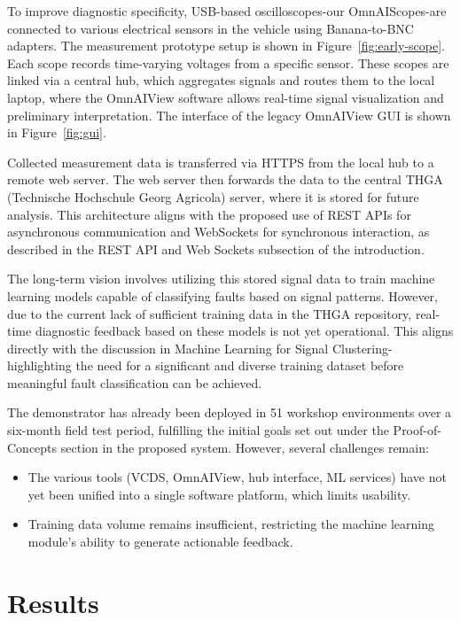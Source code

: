 To improve diagnostic specificity, USB-based oscilloscopes-our OmnAIScopes-are connected to various electrical sensors in the vehicle using Banana-to-BNC adapters. 
The measurement prototype setup is shown in Figure~\ref{fig:early-scope}.
Each scope records time-varying voltages from a specific sensor. 
These scopes are linked via a central hub, which aggregates signals and routes them to the local laptop, where the OmnAIView software allows real-time signal visualization and preliminary interpretation.
The interface of the legacy OmnAIView GUI is shown in Figure~\ref{fig:gui}.

Collected measurement data is transferred via HTTPS from the local hub to a remote web server. 
The web server then forwards the data to the central THGA (Technische Hochschule Georg Agricola) server, where it is stored for future analysis. 
This architecture aligns with the proposed use of REST APIs for asynchronous communication and WebSockets for synchronous interaction, as described in the REST API and Web Sockets subsection of the introduction.

The long-term vision involves utilizing this stored signal data to train machine learning models capable of classifying faults based on signal patterns. 
However, due to the current lack of sufficient training data in the THGA repository, real-time diagnostic feedback based on these models is not yet operational. 
This aligns directly with the discussion in Machine Learning for Signal Clustering-highlighting the need for a significant and diverse training dataset before meaningful fault classification can be achieved.

The demonstrator has already been deployed in 51 workshop environments over a six-month field test period, 
fulfilling the initial goals set out under the Proof-of-Concepts section in the proposed system. 
However, several challenges remain:
\begin{itemize}
  \item The various tools (VCDS, OmnAIView, hub interface, ML services) have not yet been unified into a single software platform, which limits usability.
  \item Training data volume remains insufficient, restricting the machine learning module’s ability to generate actionable feedback.
\end{itemize}



\section{Results}
